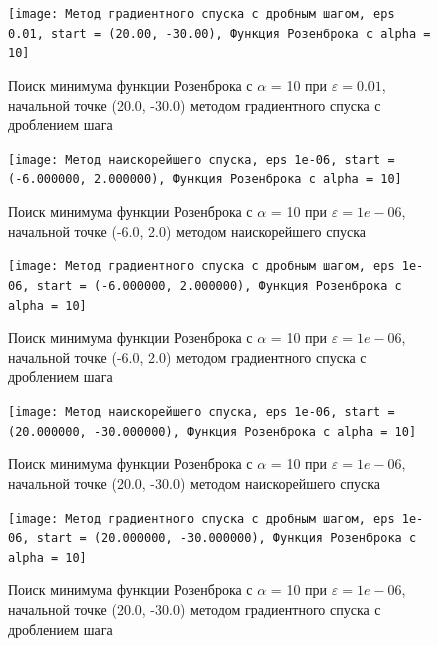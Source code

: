             \begin{figure}[H]
	        \centering
	        \texttt{[image: Метод градиентного спуска с дробным шагом, eps 0.01, start = (20.00, -30.00), Функция Розенброка с alpha = 10]}%
	        \caption{Поиск минимума функции Розенброка с $\alpha$ = 10 при $\varepsilon = 0.01$, начальной точке (20.0, -30.0) методом градиентного спуска с дроблением шага}
	        \vspace*{-1.2cm}
            \end{figure}
            
            \begin{figure}[H]
	        \centering
	        \texttt{[image: Метод наискорейшего спуска, eps 1e-06, start = (-6.000000, 2.000000), Функция Розенброка с alpha = 10]}%
	        \caption{Поиск минимума функции Розенброка с $\alpha$ = 10 при $\varepsilon = 1e-06$, начальной точке (-6.0, 2.0) методом наискорейшего спуска}
	        \vspace*{-1.2cm}
            \end{figure}
            
            \begin{figure}[H]
	        \centering
	        \texttt{[image: Метод градиентного спуска с дробным шагом, eps 1e-06, start = (-6.000000, 2.000000), Функция Розенброка с alpha = 10]}%
	        \caption{Поиск минимума функции Розенброка с $\alpha$ = 10 при $\varepsilon = 1e-06$, начальной точке (-6.0, 2.0) методом градиентного спуска с дроблением шага}
	        \vspace*{-1.2cm}
            \end{figure}
            
            \begin{figure}[H]
	        \centering
	        \texttt{[image: Метод наискорейшего спуска, eps 1e-06, start = (20.000000, -30.000000), Функция Розенброка с alpha = 10]}%
	        \caption{Поиск минимума функции Розенброка с $\alpha$ = 10 при $\varepsilon = 1e-06$, начальной точке (20.0, -30.0) методом наискорейшего спуска}
	        \vspace*{-1.2cm}
            \end{figure}
            
            \begin{figure}[H]
	        \centering
	        \texttt{[image: Метод градиентного спуска с дробным шагом, eps 1e-06, start = (20.000000, -30.000000), Функция Розенброка с alpha = 10]}%
	        \caption{Поиск минимума функции Розенброка с $\alpha$ = 10 при $\varepsilon = 1e-06$, начальной точке (20.0, -30.0) методом градиентного спуска с дроблением шага}
	        \vspace*{-1.2cm}
            \end{figure}
            